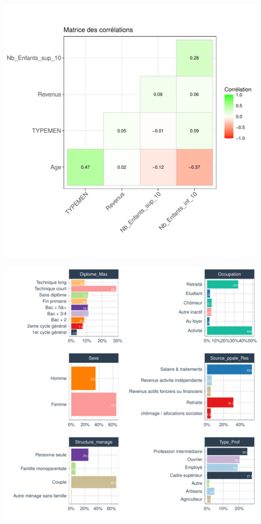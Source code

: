 \documentclass[11pt,a4paper, x11names]{article}\usepackage[]{graphicx}\usepackage[]{color}
\makeatletter
\def\maxwidth{ %
  \ifdim\Gin@nat@width>\linewidth
    \linewidth
  \else
    \Gin@nat@width
  \fi
}
\newenvironment{knitrout}{}{} %
\makeatother
\begin{document}
\begin{framed}
\begin{knitrout}
\color{fgcolor}
\includegraphics[width=\maxwidth]{figure/unnamed-chunk-5-1} 
\end{knitrout}
\end{framed}




\begin{mdframed}[linecolor=blue]
\begin{knitrout}
\color{fgcolor}
\includegraphics[width=\maxwidth]{figure/unnamed-chunk-8-1} 
\end{knitrout}
\end{mdframed}
\end{document}

